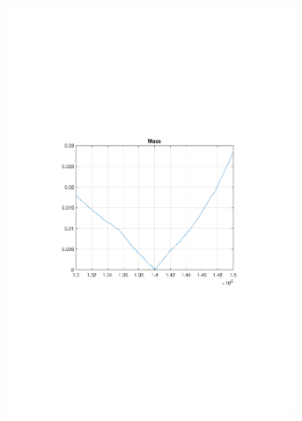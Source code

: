 \begin{frame}[c]
\begin{columns}[c]
\begin{figure}
			\end{figure}
			\vspace{-0.6cm}
			\begin{figure}
				\centering
				\includegraphics[trim=4cm 9cm 4cm 9.5cm, clip=true, width=\linewidth]{img/mass}
			\end{figure}
	\end{columns}
\end{frame}